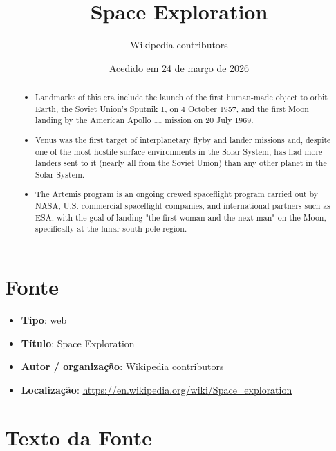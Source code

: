 \documentclass[12pt]{article}
\title{Space Exploration}
\author{Wikipedia contributors}
\date{Acedido em 24 de março de 2026}
\begin{document}
\maketitle

\begin{abstract}
\begin{itemize}
\item Landmarks of this era include the launch of the first human-made object to orbit Earth, the Soviet Union's Sputnik 1, on 4 October 1957, and the first Moon landing by the American Apollo 11 mission on 20 July 1969.
\item Venus was the first target of interplanetary flyby and lander missions and, despite one of the most hostile surface environments in the Solar System, has had more landers sent to it (nearly all from the Soviet Union) than any other planet in the Solar System.
\item The Artemis program is an ongoing crewed spaceflight program carried out by NASA, U.S. commercial spaceflight companies, and international partners such as ESA, with the goal of landing "the first woman and the next man" on the Moon, specifically at the lunar south pole region.
\end{itemize}
\end{abstract}

\section{Fonte}

\begin{itemize}
\item \textbf{Tipo}: web
\item \textbf{Título}: Space Exploration
\item \textbf{Autor / organização}: Wikipedia contributors
\item \textbf{Localização}: \url{https://en.wikipedia.org/wiki/Space_exploration}
\end{itemize}

\section{Texto da Fonte}
\end{document}
